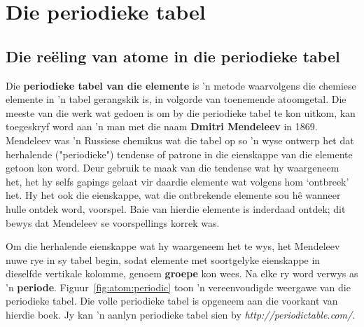          \chapter{Die periodieke tabel}
 \label{m38760*cid9}
            \section{Die re\"{e}ling van atome in die periodieke tabel}
            \nopagebreak

      \label{m38760*id261491}Die \textbf{periodieke tabel van die elemente} is 'n metode waarvolgens die chemiese elemente in 'n tabel gerangskik is,
in volgorde van toenemende atoomgetal. Die meeste van die werk wat gedoen is om by die periodieke tabel te kon uitkom, kan toegeskryf word aan 'n man met die naam \textbf{Dmitri Mendeleev} in 1869. Mendeleev was 'n Russiese chemikus wat die tabel op so 'n wyse ontwerp het dat herhalende ("periodieke") tendense of patrone in die eienskappe van die elemente getoon kon word. Deur gebruik te maak van die tendense wat hy waargeneem het, het hy selfs gapings gelaat vir daardie elemente wat volgens hom ‘ontbreek’ het. Hy het ook die eienskappe, wat die ontbrekende elemente sou h\^{e} wanneer hulle ontdek word, voorspel. Baie van hierdie elemente is inderdaad ontdek; dit bewys dat Mendeleev se voorspellings korrek was.\par 
      \label{m38760*id261511}Om die herhalende eienskappe wat hy waargeneem het te wys, het Mendeleev nuwe rye in sy tabel begin, 
sodat elemente met soortgelyke eienskappe in dieselfde vertikale kolomme, genoem \textbf{groepe} kon wees. Na elke ry word verwys as  'n \textbf{periode}. Figuur~\ref{fig:atom:periodic} toon 'n vereenvoudigde weergawe van die periodieke tabel. Die
volle periodieke tabel is opgeneem aan die voorkant van hierdie boek. Jy kan 'n aanlyn periodieke tabel sien by \textsl{http://periodictable.com/}. \par 
    \setcounter{subfigure}{0}
